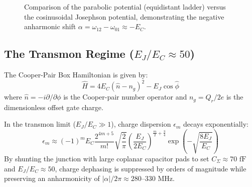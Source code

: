 \documentclass[10pt,journal,compsoc]{IEEEtran}
\begin{document}
\begin{figure}[!t]
\centering
{}
\caption{Comparison of the parabolic potential (equidistant ladder) versus the cosinusoidal Josephson potential, demonstrating the negative anharmonic shift $\alpha = \omega_{12} - \omega_{01} \approx -E_C$.}
\label{fig:anharmonicity}
\end{figure}

\subsection{The Transmon Regime ($E_J / E_C \approx 50$)}
The Cooper-Pair Box Hamiltonian is given by:
\begin{equation}
\hat{H} = 4 E_C (\hat{n} - n_g)^2 - E_J \cos\hat{\phi}
\end{equation}
where $\hat{n} = -i \partial / \partial \phi$ is the Cooper-pair number operator and $n_g = Q_r / 2e$ is the dimensionless offset gate charge.

In the transmon limit ($E_J / E_C \gg 1$), charge dispersion $\epsilon_m$ decays exponentially:
\begin{equation}
\epsilon_m \approx (-1)^m E_C \frac{2^{4m+5}}{m!} \sqrt{\frac{2}{\pi}} \left(\frac{E_J}{2E_C}\right)^{\frac{m}{2} + \frac{3}{4}} \exp\left(-\sqrt{\frac{8E_J}{E_C}}\right)
\end{equation}
By shunting the junction with large coplanar capacitor pads to set $C_\Sigma \approx 70\text{ fF}$ and $E_J/E_C \approx 50$, charge dephasing is suppressed by orders of magnitude while preserving an anharmonicity of $|\alpha|/2\pi \approx 280\text{--}330\text{ MHz}$.
\end{document}
